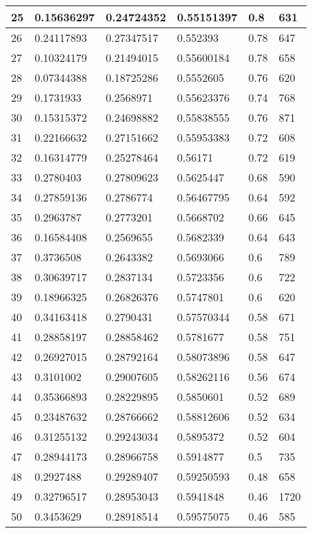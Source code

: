 \begin{longtable}{|l|l|l|l|l|l|}
25 & 0.15636297 & 0.24724352 & 0.55151397 & 0.8 & 631 \\ \hline 
26 & 0.24117893 & 0.27347517 & 0.552393 & 0.78 & 647 \\ \hline 
27 & 0.10324179 & 0.21494015 & 0.55600184 & 0.78 & 658 \\ \hline 
28 & 0.07344388 & 0.18725286 & 0.5552605 & 0.76 & 620 \\ \hline 
29 & 0.1731933 & 0.2568971 & 0.55623376 & 0.74 & 768 \\ \hline 
30 & 0.15315372 & 0.24698882 & 0.55838555 & 0.76 & 871 \\ \hline 
31 & 0.22166632 & 0.27151662 & 0.55953383 & 0.72 & 608 \\ \hline 
32 & 0.16314779 & 0.25278464 & 0.56171 & 0.72 & 619 \\ \hline 
33 & 0.2780403 & 0.27809623 & 0.5625447 & 0.68 & 590 \\ \hline 
34 & 0.27859136 & 0.2786774 & 0.56467795 & 0.64 & 592 \\ \hline 
35 & 0.2963787 & 0.2773201 & 0.5668702 & 0.66 & 645 \\ \hline 
36 & 0.16584408 & 0.2569655 & 0.5682339 & 0.64 & 643 \\ \hline 
37 & 0.3736508 & 0.2643382 & 0.5693066 & 0.6 & 789 \\ \hline 
38 & 0.30639717 & 0.2837134 & 0.5723356 & 0.6 & 722 \\ \hline 
39 & 0.18966325 & 0.26826376 & 0.5747801 & 0.6 & 620 \\ \hline 
40 & 0.34163418 & 0.2790431 & 0.57570344 & 0.58 & 671 \\ \hline 
41 & 0.28858197 & 0.28858462 & 0.5781677 & 0.58 & 751 \\ \hline 
42 & 0.26927015 & 0.28792164 & 0.58073896 & 0.58 & 647 \\ \hline 
43 & 0.3101002 & 0.29007605 & 0.58262116 & 0.56 & 674 \\ \hline 
44 & 0.35366893 & 0.28229895 & 0.5850601 & 0.52 & 689 \\ \hline 
45 & 0.23487632 & 0.28766662 & 0.58812606 & 0.52 & 634 \\ \hline 
46 & 0.31255132 & 0.29243034 & 0.5895372 & 0.52 & 604 \\ \hline 
47 & 0.28944173 & 0.28966758 & 0.5914877 & 0.5 & 735 \\ \hline 
48 & 0.2927488 & 0.29289407 & 0.59250593 & 0.48 & 658 \\ \hline 
49 & 0.32796517 & 0.28953043 & 0.5941848 & 0.46 & 1720 \\ \hline 
50 & 0.3453629 & 0.28918514 & 0.59575075 & 0.46 & 585 \\ \hline 
\end{longtable}